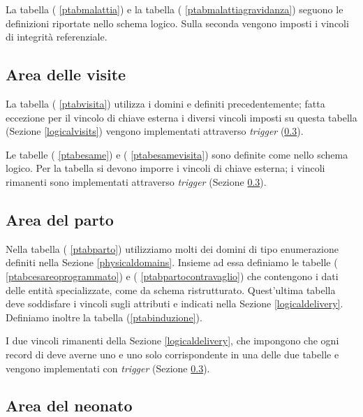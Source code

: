 La tabella  (\lstlistingname{} \ref{ptabmalattia}) e la tabella  (\lstlistingname{} \ref{ptabmalattiagravidanza}) seguono le definizioni riportate nello schema logico.
Sulla seconda vengono imposti i vincoli di integrità referenziale.

\subsection{Area delle visite}

La tabella  (\lstlistingname{} \ref{ptabvisita}) utilizza i domini  e  definiti precedentemente; fatta eccezione per il vincolo di chiave esterna i diversi vincoli imposti su questa tabella (Sezione \ref{logicalvisits}) vengono implementati attraverso \emph{trigger} (\ref{}).

Le tabelle  (\lstlistingname{} \ref{ptabesame}) e  (\lstlistingname{} \ref{ptabesamevisita}) sono definite come nello schema logico.
Per la tabella  si devono imporre i vincoli di chiave esterna; i vincoli rimanenti sono implementati attraverso \emph{trigger} (Sezione \ref{}).

\subsection{Area del parto}

Nella tabella  (\lstlistingname{} \ref{ptabparto}) utilizziamo molti dei domini di tipo enumerazione definiti nella Sezione \ref{physicaldomains}.
Insieme ad essa definiamo le tabelle  (\lstlistingname{} \ref{ptabcesareoprogrammato}) e  (\lstlistingname{} \ref{ptabpartocontravaglio}) che contengono i dati delle entità specializzate, come da schema ristrutturato.
Quest'ultima tabella deve soddisfare i vincoli sugli attributi  e  indicati nella Sezione \ref{logicaldelivery}.
Definiamo inoltre la tabella  (\lstlistingname \ref{ptabinduzione}).

I due vincoli rimanenti della Sezione \ref{logicaldelivery}, che impongono che ogni record di  deve averne uno e uno solo corrispondente in una delle due tabelle  e  vengono implementati con \emph{trigger} (Sezione \ref{}).

\subsection{Area del neonato}

